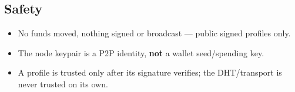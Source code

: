 \documentclass[
]{article}
\providecommand{\tightlist}{%
  \setlength{\itemsep}{0pt}\setlength{\parskip}{0pt}}
\begin{document}
\hypertarget{safety}{%
\subsection{Safety}\label{safety}}

\begin{itemize}
\tightlist
\item
  No funds moved, nothing signed or broadcast --- public signed profiles
  only.
\item
  The node keypair is a P2P identity, \textbf{not} a wallet
  seed/spending key.
\item
  A profile is trusted only after its signature verifies; the
  DHT/transport is never trusted on its own.
\end{itemize}
\end{document}
